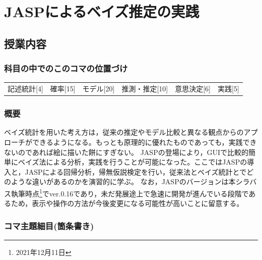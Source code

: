 \section{JASPによるベイズ推定の実践}
\label{D1_lesson28}

\subsection{授業内容}
\subsubsection{科目の中でのこのコマの位置づけ}
\begin{tabular}[t]{cccccc}
    記述統計[4] & 確率[15] & モデル[20] & 推測・推定[10] & 意思決定[6] & 実践[5]
\end{tabular}
\subsubsection{概要}
ベイズ統計を用いた考え方は，従来の推定やモデル比較と異なる観点からのアプローチができるようになる。もっとも原理的に優れたものであっても，実践できないのであれば絵に描いた餅にすぎない。
JASPの登場により，GUIで比較的簡単にベイズ法による分析，実践を行うことが可能になった。ここではJASPの導入と，JASPによる回帰分析，帰無仮説検定を行い，従来法とベイズ統計とでどのような違いがあるのかを演習的に学ぶ。
なお，JASPのバージョンは本シラバス執筆時点\footnote{2021年12月11日}でver.0.16であり，未だ発展途上で急速に開発が進んでいる段階であるため，表示や操作の方法が今後変更になる可能性が高いことに留意する。
\subsubsection{コマ主題細目(箇条書き)}

